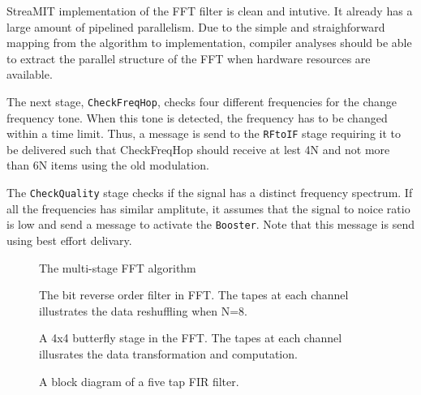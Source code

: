 StreaMIT implementation of the FFT filter is clean and intutive. It
already has a large amount of pipelined parallelism. Due to the simple
and straighforward mapping from the algorithm to implementation,
compiler analyses should be able to extract the parallel structure of
the FFT when hardware resources are available.

The next stage, {\tt CheckFreqHop}, checks four different frequencies
for the change frequency tone. When this tone is detected, the
frequency has to be changed within a time limit. Thus, a message is
send to the {\tt RFtoIF} stage requiring it to be delivered such that 
CheckFreqHop should receive at lest 4N and not more than 6N items
using the old modulation.

The {\tt CheckQuality} stage checks if the signal has a distinct
frequency spectrum. If all the frequencies has similar amplitute, it
assumes that the signal to noice ratio is low and send a message to
activate the {\tt Booster}. Note that this message is send using best
effort delivary.



\begin{figure}
\centering
{}
\caption{The multi-stage FFT algorithm}
\label{fig:fftfilter}
\end{figure}

\begin{figure*}
\centering
{}
\caption{The bit reverse order filter in FFT. The tapes at each
channel illustrates the data reshuffling when N=8. }
\label{fig:bitreverseorder}
\end{figure*}

\begin{figure*}
\centering
{}
\caption{A 4x4 butterfly stage in the FFT. The tapes at each channel illusrates the data transformation and computation. }
\label{fig:butterfly}
\end{figure*}

\begin{figure}
\centering
{}
\caption{A block diagram of a five tap FIR filter.}
\label{fig:firfilter}
\end{figure}



\newpage

